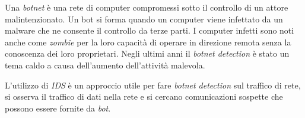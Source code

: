 \documentclass[../main.tex]{subfiles}
\begin{document}
Una \textit{botnet} è una rete di computer compromessi sotto il controllo di un attore malintenzionato. Un bot si forma quando un computer viene infettato da un malware che ne consente il controllo da terze parti. I computer infetti sono noti anche come \textit{zombie} per la loro capacità di operare in direzione remota senza la conoscenza dei loro proprietari. Negli ultimi anni il \textit{botnet detection} è stato un tema caldo a causa dell'aumento dell'attività malevola.

L'utilizzo di \textit{IDS} è un approccio utile per fare \textit{botnet detection} sul traffico di rete, si osserva il traffico di dati nella rete e si cercano comunicazioni sospette che possono essere fornite da \textit{bot}. \newline
\end{document}

